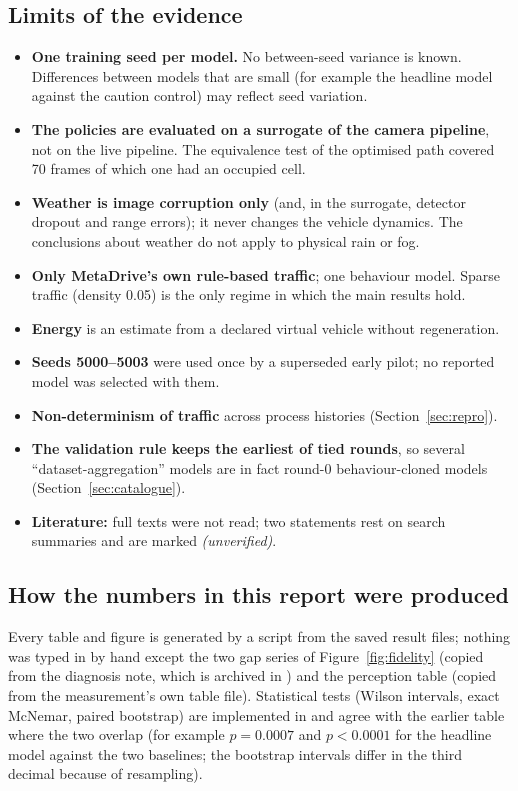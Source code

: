 \subsection{Limits of the evidence}
\begin{itemize}
\item \textbf{One training seed per model.} No between-seed variance is known. Differences between models that are small (for example the headline model against the caution control) may reflect seed variation.
\item \textbf{The policies are evaluated on a surrogate of the camera pipeline}, not on the live pipeline. The equivalence test of the optimised path covered 70 frames of which one had an occupied cell.
\item \textbf{Weather is image corruption only} (and, in the surrogate, detector dropout and range errors); it never changes the vehicle dynamics. The conclusions about weather do not apply to physical rain or fog.
\item \textbf{Only MetaDrive's own rule-based traffic}; one behaviour model. Sparse traffic (density 0.05) is the only regime in which the main results hold.
\item \textbf{Energy} is an estimate from a declared virtual vehicle without regeneration.
\item \textbf{Seeds 5000--5003} were used once by a superseded early pilot; no reported model was selected with them.
\item \textbf{Non-determinism of traffic} across process histories (Section~\ref{sec:repro}).
\item \textbf{The validation rule keeps the earliest of tied rounds}, so several ``dataset-aggregation'' models are in fact round-0 behaviour-cloned models (Section~\ref{sec:catalogue}).
\item \textbf{Literature:} full texts were not read; two statements rest on search summaries and are marked \emph{(unverified)}.
\end{itemize}

\subsection{How the numbers in this report were produced}
Every table and figure is generated by a script from the saved result files; nothing was typed in by hand except the two gap series of Figure~\ref{fig:fidelity} (copied from the diagnosis note, which is archived in ) and the perception table (copied from the measurement's own table file). Statistical tests (Wilson intervals, exact McNemar, paired bootstrap) are implemented in  and agree with the earlier table  where the two overlap
(for example $p=0.0007$ and $p<0.0001$ for the headline model against the two baselines; the bootstrap intervals differ in the third decimal because of resampling).
